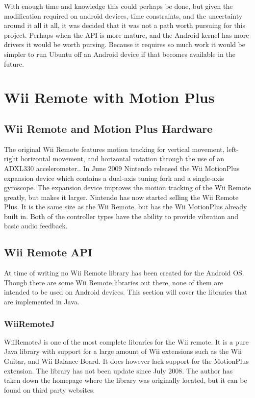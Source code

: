 With enough time and knowledge this could perhaps be done, but given the modification required on android devices, time constraints, and the uncertainty around it all it all, it was decided that it was not a path worth pursuing for this project. Perhaps when the API is more mature, and the Android kernel has more drivers it would be worth pursing. Because it requires so much work it would be simpler to run Ubuntu off an Android device if that becomes available in the future. \cite{ubuntuAndroid}

\section{Wii Remote with Motion Plus}

\subsection{Wii Remote and Motion Plus Hardware}
The original Wii Remote features motion tracking for vertical movement, left-right horizontal movement, and horizontal rotation through the use of an ADXL330 accelerometer.\cite{wiiAccelerometer}.
In June 2009 Nintendo released the Wii MotionPlus expansion device which contains a dual-axis tuning fork and a single-axis gyroscope\cite{wiiMotionPlus}.
The expansion device improves the motion tracking of the Wii Remote greatly, but makes it larger. Nintendo has now started selling the Wii Remote Plus. It is the same size as the Wii Remote, but has the Wii MotionPlus already built in. Both of the controller types have the ability to provide vibration and basic audio feedback.

\subsection{Wii Remote API}
At time of writing no Wii Remote library has been created for the Android OS. Though there are some Wii Remote libraries out there, none of them are intended to be used on Android devices. This section will cover the libraries that are implemented in Java.

\subsubsection{WiiRemoteJ}
WiiRemoteJ is one of the most complete libraries for the Wii remote. It is a pure Java library with support for a large amount of Wii extensions such as the Wii Guitar, and Wii Balance Board. It does however lack support for the MotionPlus extension. The library has not been update since July 2008. The author has taken down the homepage where the library was originally located, but it can be found on third party websites. \cite{WiiRemoteJ}


